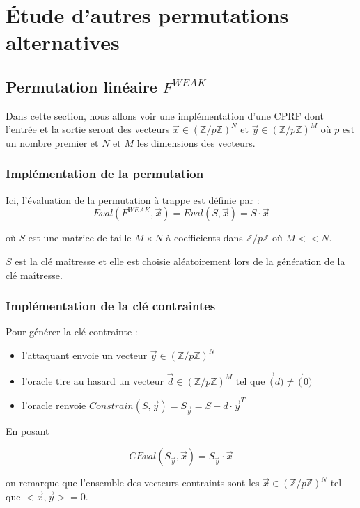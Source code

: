 \documentclass[9pt]{extarticle}
\begin{document}
\section{Étude d'autres permutations alternatives}
\subsection{Permutation linéaire $F^{WEAK}$}

Dans cette section, nous allons voir une implémentation d'une CPRF dont l'entrée et la sortie seront des vecteurs $\vec{x} \in (\mathbb{Z}/p\mathbb{Z})^N $ et $\vec{y} \in (\mathbb{Z}/p\mathbb{Z})^M$ où $p$ est un nombre premier et $N$ et $M$ les dimensions des vecteurs.

\subsubsection{Implémentation de la permutation}
Ici, l'évaluation de la permutation à trappe est définie par :
\[Eval(F^{WEAK},\vec{x}) = Eval(S,\vec{x}) = S \cdot \vec{x}\] 

où $S$ est une matrice de taille $M \times N$ à coefficients dans $\mathbb{Z}/p\mathbb{Z}$ où $M << N$.

$S$ est la clé maîtresse et elle est choisie aléatoirement lors de la génération de la clé maîtresse.

\subsubsection{Implémentation de la clé contraintes}

Pour générer la clé contrainte :
\begin{itemize}
  \item l'attaquant envoie un vecteur $\vec{y} \in (\mathbb{Z}/p\mathbb{Z})^N$
  \item l'oracle tire au hasard un vecteur $\vec{d} \in (\mathbb{Z}/p\mathbb{Z})^M$ tel que $\vec(d) \neq \vec(0)$
  \item l'oracle renvoie $Constrain(S, \vec{y}) = S_{\vec{y}} = S + d \cdot \vec{y}^T$
\end{itemize}

En posant 

\[CEval(S_{\vec{y}}, \vec{x}) =  S_{\vec{y}} \cdot \vec{x}\]

on remarque que l'ensemble des vecteurs contraints sont les $\vec{x} \in (\mathbb{Z}/p\mathbb{Z})^N $ tel que $<\vec{x},\vec{y}> = 0$.
\end{document}
